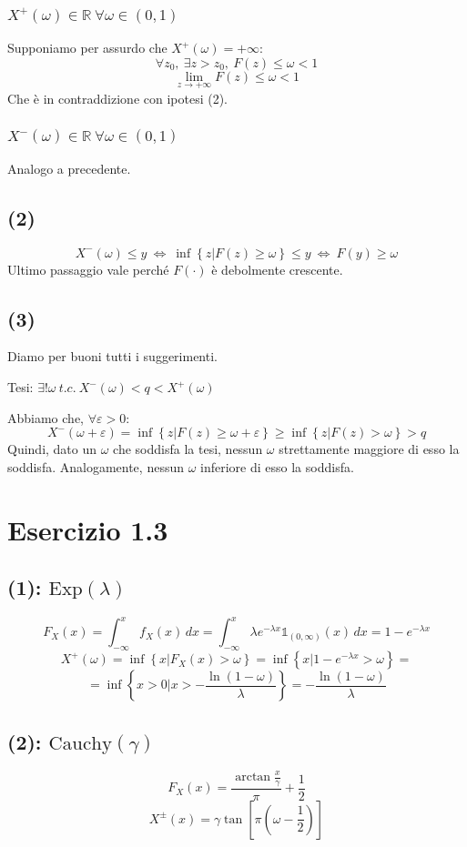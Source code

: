 \documentclass{article}
\begin{document}
\subsubsection{$X^+(\omega) \in \mathbb{R} \ \forall \omega\in \left(0,1\right)$}
Supponiamo per assurdo che $X^+ (\omega) = +\infty$:
\[
	\forall z_0, \ \exists z>z_0, \ F(z) \leq \omega < 1
\]
\[
	\lim_{z\rightarrow +\infty} F(z) \leq \omega < 1	
\]
Che è in contraddizione con ipotesi (2).
\subsubsection{$X^-(\omega) \in \mathbb{R} \ \forall \omega\in \left(0,1\right)$}
Analogo a precedente.


\subsection{(2)}
\[
	X^-(\omega) \leq y \  \Longleftrightarrow  \  \inf \left\{z| F(z) \geq \omega\right\} \leq y \  \Longleftrightarrow  \  F(y) \geq \omega
\]
Ultimo passaggio vale perché $F(\cdot)$ è debolmente crescente.

\subsection{(3)}
Diamo per buoni tutti i suggerimenti.

Tesi: $\exists! \omega \ t.c. \ X^-(\omega) < q < X^+(\omega)$

Abbiamo che, $\forall \varepsilon > 0$:
\[
	X^-(\omega+\varepsilon) = \inf \left\{z| F(z) \geq \omega+\varepsilon\right\} \geq \inf \left\{z| F(z) > \omega\right\} > q
\]
Quindi, dato un $\omega$ che soddisfa la tesi, nessun $\omega$ strettamente maggiore di esso la soddisfa. Analogamente, nessun $\omega$ inferiore di esso la soddisfa.

\section{Esercizio 1.3}
\subsection{(1): $\mathrm{Exp}(\lambda)$}
\[
	F_X(x)= \int_{-\infty }^{x}f_X(x)\,dx = \int_{-\infty }^{x} \lambda e^{-\lambda x} \mathds{1}_{(0,\infty )}(x) \,dx = 1-e^{-\lambda x}
\]
\[
	X^+(\omega) = \inf\left\{x| F_X(x)>\omega\right\} = \inf\left\{x| 1-e^{-\lambda x} > \omega\right\} = 
\]
\[	= \inf\left\{x>0| x>- \frac{\ln\left(1 - \omega\right)}{\lambda} \right\} = - \frac{\ln\left(1 - \omega\right)}{\lambda}\]

\subsection{(2): $\mathrm{Cauchy}(\gamma)$}
\[
	F_X(x) = \frac{\arctan \frac{x}{\gamma}}{\pi} + \frac{1}{2}
\]
\[
	X^\pm(x) = \gamma \tan \left[\pi\left(\omega - \frac{1}{2}\right)\right]
\]
\end{document}

